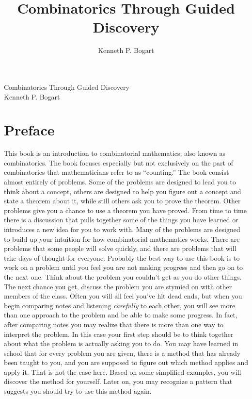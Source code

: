 \documentclass[10pt,]{book}
\title{Combinatorics Through Guided Discovery}
\author{Kenneth P. Bogart
}
\date{}
\theoremstyle{plain}
\theoremstyle{definition}
\numberwithin{equation}{chapter}
\begin{document}
\frontmatter
\thispagestyle{empty}
{\centering
\vspace*{0.14\textheight}
{\Huge Combinatorics Through Guided Discovery}\\[3\baselineskip]
{\Large Kenneth P. Bogart}\\}
\clearpage
\thispagestyle{empty}
\null\clearpage
\chapter*{Preface}\label{preface-1}
This book is an introduction to combinatorial mathematics, also known as combinatorics. The book focuses especially but not exclusively on the part of combinatorics that mathematicians refer to as ``counting.'' The book consist almost entirely of problems.  Some of the problems are designed to lead you to think about a concept, others are designed to help you figure out a concept and state a theorem about it, while still others ask you to prove the theorem. Other problems give you a chance to use a theorem you have proved. From time to time there is a discussion that pulls together some of the things you have learned or introduces a new idea for you to work with. Many of the problems are designed to build up your intuition for how combinatorial mathematics works. There are problems that some people will solve quickly, and there are problems that will take days of thought for everyone. Probably the best way to use this book is to work on a problem until you feel you are not making progress and then go on to the next one. Think about the problem you couldn't get as you do other things. The next chance you get, discuss the problem you are stymied on with other members of the class. Often you will all feel you've hit dead ends, but when you begin comparing notes and listening \emph{carefully} to each other, you will see more than one approach to the problem and be able to make some progress. In fact, after comparing notes you may realize that there is more than one way to interpret the problem. In this case your first step should be to think together about what the problem is actually asking you to do. You may have learned in school that for every problem you are given, there is a method that has already been taught to you, and you are supposed to figure out which method applies and apply it. That is not the case here.  Based on some simplified examples, you will discover the method for yourself. Later on, you may recognize a pattern that suggests you should try to use this method again.%
\end{document}
